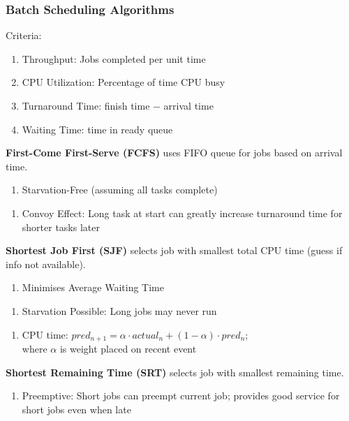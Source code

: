 \documentclass[12pt, a4paper]{article}
\begin{document}
\begin{multicols*}{3}
\subsubsection{Batch Scheduling Algorithms}
Criteria:
\begin{enumerate}[\roman*.]
  \item Throughput: Jobs completed per unit time
  \item CPU Utilization: Percentage of time CPU busy
  \item Turnaround Time: finish time $-$ arrival time
  \item Waiting Time: time in ready queue
\end{enumerate}

\textbf{First-Come First-Serve (FCFS)} uses FIFO queue for jobs based on arrival time.
\begin{enumerate}[$+$]
  \item Starvation-Free (assuming all tasks complete)
\end{enumerate}\vspace{-1pt}
\begin{enumerate}[$-$]
  \item Convoy Effect: Long task at start can greatly increase turnaround time for shorter tasks later
\end{enumerate}

\textbf{Shortest Job First (SJF)} selects job with smallest total CPU time (guess if info not available).
\begin{enumerate}[$+$]
  \item Minimises Average Waiting Time
\end{enumerate}\vspace{-1pt}
\begin{enumerate}[$-$]
  \item Starvation Possible: Long jobs may never run
\end{enumerate}\vspace{-1pt}
\begin{enumerate}[\roman*.]
  \item CPU time: $pred_{n+1} = \alpha\cdot actual_{n}+(1-\alpha)\cdot pred_{n}$;\\
    where $\alpha$ is weight placed on recent event
\end{enumerate}

\textbf{Shortest Remaining Time (SRT)} selects job with smallest remaining time.
\begin{enumerate}[$+$]
  \item Preemptive: Short jobs can preempt current job; provides good service for short jobs even when late
\end{enumerate}
\vspace{-1em}
\colbreak

\end{multicols*}
\end{document}

